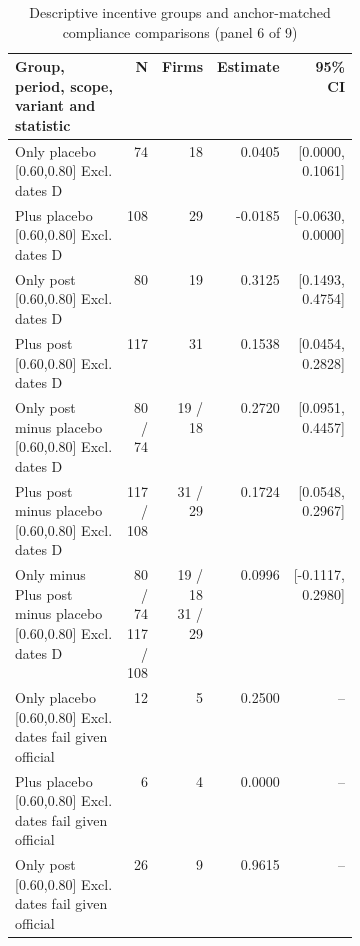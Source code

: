 \begin{table}[!htbp]\centering\scriptsize
\caption{Descriptive incentive groups and anchor-matched compliance comparisons (panel 6 of 9)}
\begin{threeparttable}
\begin{tabular}{p{0.40\linewidth}rrrr}
\toprule
Group, period, scope, variant and statistic & N & Firms & Estimate & 95\% CI \\
\midrule
Only placebo [0.60,0.80] Excl. dates D & 74 & 18 & 0.0405 & [0.0000, 0.1061] \\
Plus placebo [0.60,0.80] Excl. dates D & 108 & 29 & -0.0185 & [-0.0630, 0.0000] \\
Only post [0.60,0.80] Excl. dates D & 80 & 19 & 0.3125 & [0.1493, 0.4754] \\
Plus post [0.60,0.80] Excl. dates D & 117 & 31 & 0.1538 & [0.0454, 0.2828] \\
Only post minus placebo [0.60,0.80] Excl. dates D & 80 / 74 & 19 / 18 & 0.2720 & [0.0951, 0.4457] \\
Plus post minus placebo [0.60,0.80] Excl. dates D & 117 / 108 & 31 / 29 & 0.1724 & [0.0548, 0.2967] \\
Only minus Plus post minus placebo [0.60,0.80] Excl. dates D & \shortstack{80 / 74\\117 / 108} & \shortstack{19 / 18\\31 / 29} & 0.0996 & [-0.1117, 0.2980] \\
Only placebo [0.60,0.80] Excl. dates fail given official & 12 & 5 & 0.2500 & -- \\
Plus placebo [0.60,0.80] Excl. dates fail given official & 6 & 4 & 0.0000 & -- \\
Only post [0.60,0.80] Excl. dates fail given official & 26 & 9 & 0.9615 & -- \\
\bottomrule
\end{tabular}
\begin{tablenotes}[flushleft]\footnotesize

\end{tablenotes}
\end{threeparttable}
\end{table}
